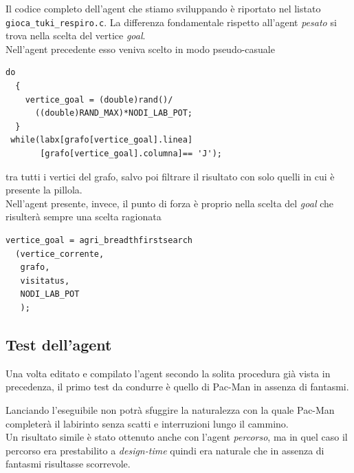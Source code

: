 \documentclass[8pt]{book}
\begin{document}
Il codice completo dell'agent che stiamo sviluppando è riportato nel listato \texttt{gioca\_tuki\_respiro.c}. La differenza fondamentale rispetto all'agent \emph{pesato} si trova nella scelta del vertice \emph{goal}.\\
Nell'agent precedente esso veniva scelto in modo pseudo-casuale

\begin{spacing}{0.9}
  \begin{small}
    \begin{tcolorbox}
\begin{verbatim}
do
  {
    vertice_goal = (double)rand()/
      ((double)RAND_MAX)*NODI_LAB_POT;
  }
 while(labx[grafo[vertice_goal].linea]
       [grafo[vertice_goal].columna]== 'J');
\end{verbatim}
  \end{tcolorbox}
    \end{small}
      \end{spacing}
  
    tra tutti i vertici del grafo, salvo poi filtrare il risultato con solo quelli in cui è presente la pillola.\\
    Nell'agent presente, invece, il punto di forza è proprio nella scelta del \emph{goal} che risulterà sempre una scelta ragionata

\begin{spacing}{0.9}
  \begin{small}
    \begin{tcolorbox}
\begin{verbatim}
vertice_goal = agri_breadthfirstsearch
  (vertice_corrente, 
   grafo,
   visitatus,
   NODI_LAB_POT
   );
\end{verbatim}
  \end{tcolorbox}
    \end{small}
      \end{spacing}

\subsection{Test dell'agent}

Una volta editato e compilato l'agent secondo la solita procedura già vista in precedenza, il primo test da condurre è quello di Pac-Man in assenza di fantasmi.

Lanciando l'eseguibile non potrà sfuggire la naturalezza con la quale Pac-Man completerà il labirinto senza scatti e interruzioni lungo il cammino.\\
Un risultato simile è stato ottenuto anche con l'agent \emph{percorso}, ma in quel caso il percorso era prestabilito a \emph{design-time} quindi era naturale che in assenza di fantasmi risultasse scorrevole.
\end{document}
